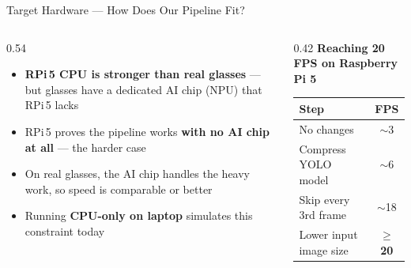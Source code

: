 \documentclass[aspectratio=169]{beamer}
\begin{document}
\begin{frame}{Target Hardware — How Does Our Pipeline Fit?}

\begin{table}
  \centering
  \renewcommand{\arraystretch}{1.55}
\end{table}

\vspace{0.25cm}
\begin{columns}[T]
\begin{column}{0.54\textwidth}
  \begin{itemize}\setlength{\itemsep}{0.28cm}
    \item \textbf{RPi\,5 CPU is stronger than real glasses} — but glasses have a dedicated AI chip (NPU) that RPi\,5 lacks
    \item RPi\,5 proves the pipeline works \textbf{with no AI chip at all} — the harder case
    \item On real glasses, the AI chip handles the heavy work, so speed is comparable or better
    \item Running \textbf{CPU-only on laptop} simulates this constraint today
  \end{itemize}
\end{column}
\begin{column}{0.42\textwidth}
  \textbf{Reaching 20 FPS on Raspberry Pi 5}
  \vspace{0.1cm}
  \begin{table}
    \renewcommand{\arraystretch}{1.45}\small
    \begin{tabular}{lc}
    \toprule
    \textbf{Step} & \textbf{FPS} \\
    \midrule
    No changes             & $\sim$3  \\
    Compress YOLO model    & $\sim$6  \\
    Skip every 3rd frame   & $\sim$18 \\
    Lower input image size & $\geq$\textbf{20} \\
    \bottomrule
    \end{tabular}
  \end{table}
\end{column}
\end{columns}
\end{frame}
\end{document}
